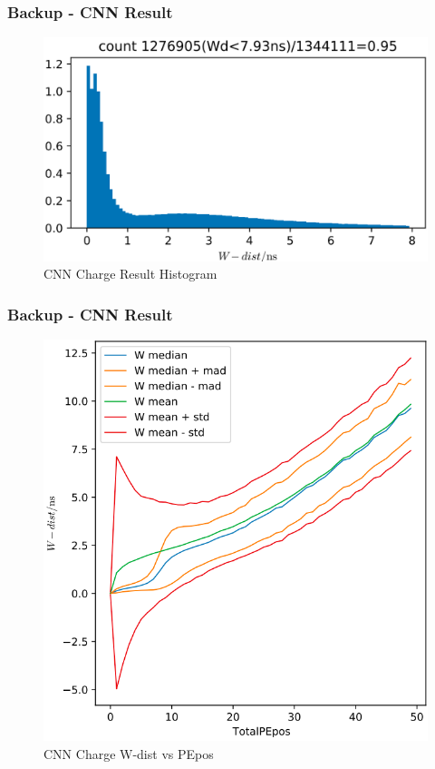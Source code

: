 \documentclass{beamer}
\begin{document}
\begin{frame}[noframenumbering]
\thispagestyle{empty}
\frametitle{Backup - CNN Result}
\begin{figure}
    \centering
    \caption{CNN Charge Result Histogram}
    \includegraphics[width=0.85\linewidth]{img/takarachargehist.png}
\end{figure}
\end{frame}

\begin{frame}[noframenumbering]
\thispagestyle{empty}
\frametitle{Backup - CNN Result}
\setlength{\abovecaptionskip}{0mm}
\setlength{\belowcaptionskip}{0mm}
\begin{figure}
    \centering
    \caption{CNN Charge W-dist vs PEpos}
    \includegraphics[width=0.65\linewidth]{img/takarachargestats.png}
\end{figure}
\end{frame}
\end{document}
